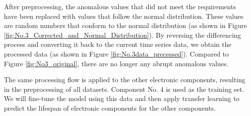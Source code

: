 

After preprocessing, the anomalous values that did not meet the requirements have been replaced with values that follow the normal distribution. These values are random numbers that conform to the normal distribution (as shown in Figure \ref{fig:No.3_Corrected_and_Normal_Distribution}). By reversing the differencing process and converting it back to the current time series data, we obtain the processed data (as shown in Figure \ref{fig:No.3data_precessed}). Compared to Figure \ref{fig:No3_original}, there are no longer any abrupt anomalous values.

The same processing flow is applied to the other electronic components, resulting in the preprocessing of all datasets. Component No. 4 is used as the training set. We will fine-tune the model using this data and then apply transfer learning to predict the lifespan of electronic components for the other components.

